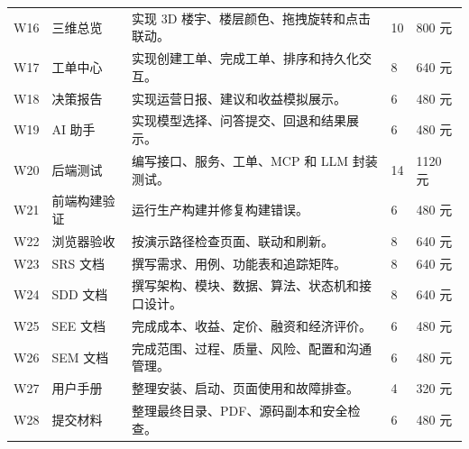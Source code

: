 \documentclass[12pt,a4paper]{ctexart}
\begin{document}
\begin{longtable}{L{1.5cm}L{3.2cm}L{5.8cm}L{1.6cm}L{2.4cm}}
W16 & 三维总览 & 实现 3D 楼宇、楼层颜色、拖拽旋转和点击联动。 & 10 & 800 元 \\
W17 & 工单中心 & 实现创建工单、完成工单、排序和持久化交互。 & 8 & 640 元 \\
W18 & 决策报告 & 实现运营日报、建议和收益模拟展示。 & 6 & 480 元 \\
W19 & AI 助手 & 实现模型选择、问答提交、回退和结果展示。 & 6 & 480 元 \\
W20 & 后端测试 & 编写接口、服务、工单、MCP 和 LLM 封装测试。 & 14 & 1120 元 \\
W21 & 前端构建验证 & 运行生产构建并修复构建错误。 & 6 & 480 元 \\
W22 & 浏览器验收 & 按演示路径检查页面、联动和刷新。 & 8 & 640 元 \\
W23 & SRS 文档 & 撰写需求、用例、功能表和追踪矩阵。 & 8 & 640 元 \\
W24 & SDD 文档 & 撰写架构、模块、数据、算法、状态机和接口设计。 & 8 & 640 元 \\
W25 & SEE 文档 & 完成成本、收益、定价、融资和经济评价。 & 6 & 480 元 \\
W26 & SEM 文档 & 完成范围、过程、质量、风险、配置和沟通管理。 & 6 & 480 元 \\
W27 & 用户手册 & 整理安装、启动、页面使用和故障排查。 & 4 & 320 元 \\
W28 & 提交材料 & 整理最终目录、PDF、源码副本和安全检查。 & 6 & 480 元 \\
\bottomrule
\end{longtable}
\end{document}

